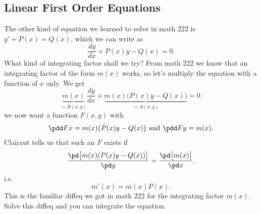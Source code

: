 \subsection{Linear First Order Equations}  The other kind of equation we learned
to solve in math 222 is $y' + P(x) = Q(x)$, which we can write as
\[
\frac{dy}{dx} + P(x)y-Q(x)  = 0.
\]
What kind of integrating factor shall we try?  From math 222 we know that an
integrating factor of the form $m(x)$ works, so let's multiply the equation with
a function of $x$ only.  We get
\[
\underbrace{m(x)}_{=B(x, y)}\frac{dy}{dx} +
\underbrace{m(x)\bigl(P(x)y-Q(x)\bigr)}_{ = A(x,y)}  = 0.
\]
we now want a function $F(x, y) $ with
\[
\pdd Fx  = m(x)\bigl(P(x)y-Q(x)\bigr)
\text{ and }
\pdd Fy  = m(x).
\]
Clairaut tells us that such an $F$ exists if 
\[
\frac{\pd\bigl[m(x)(P(x)y-Q(x))\bigr]}{\pd y}
=
\frac{\pd\bigl[m(x)\bigr]}{\pd x},
\]
i.e.
\[
m'(x) = m(x) P(x).
\]
This is the familiar diffeq we got in math 222 for the integrating factor
$m(x)$.  Solve this diffeq and you can integrate the equation.



